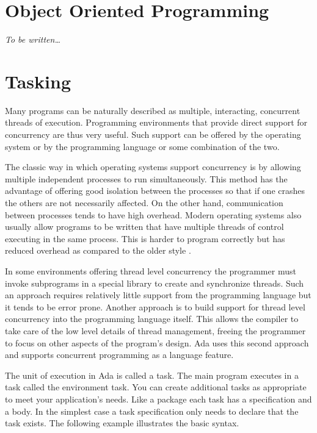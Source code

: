 \section{Object Oriented Programming}

\textit{To be written\ldots}

\section{Tasking}

Many programs can be naturally described as multiple, interacting, concurrent threads of
execution. Programming environments that provide direct support for concurrency are thus very
useful. Such support can be offered by the operating system or by the programming language or
some combination of the two.

The classic way in which operating systems support concurrency is by allowing multiple
independent processes to run simultaneously. This method has the advantage of offering good
isolation between the processes so that if one crashes the others are not necessarily affected.
On the other hand, communication between processes tends to have high overhead. Modern operating
systems also usually allow programs to be written that have multiple threads of control
executing in the same process. This  is harder to program
correctly but has reduced overhead as compared to the older style .

In some environments offering thread level concurrency the programmer must invoke subprograms in
a special library to create and synchronize threads. Such an approach requires relatively little
support from the programming language but it tends to be error prone. Another approach is to
build support for thread level concurrency into the programming language itself. This allows the
compiler to take care of the low level details of thread management, freeing the programmer to
focus on other aspects of the program's design. Ada uses this second approach and supports
concurrent programming as a language feature.

The unit of execution in Ada is called a task. The main program executes in a task called the
environment task. You can create additional tasks as appropriate to meet your application's
needs. Like a package each task has a specification and a body. In the simplest case a task
specification only needs to declare that the task exists. The following example illustrates the
basic syntax.

